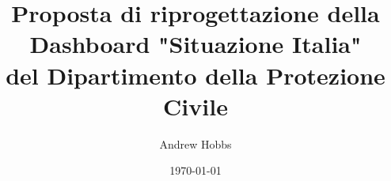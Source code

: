 \documentclass[11pt]{article}
\title{Proposta di riprogettazione della\\Dashboard "Situazione Italia"\\del Dipartimento della Protezione Civile}
\author{Andrew Hobbs}
\date{\today}
\begin{document}
\begin{titlepage}
\maketitle
\end{titlepage}

\linespread{1.15} %



{
    \hypersetup{linkcolor=black}
    \rmfamily{\tableofcontents}
}
\clearpage















% 
% 
\end{document}
